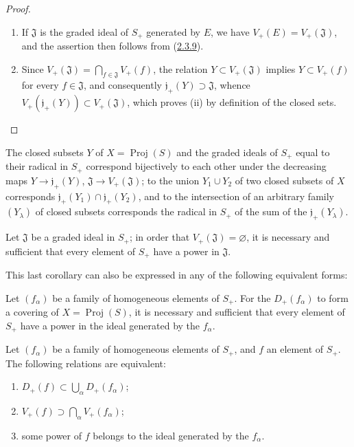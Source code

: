 \begin{proof}
\begin{enumerate}
  \item[\rm(i)] If $\mathfrak{J}$ is the graded ideal of $S_+$ generated
    by $E$, we have $V_+(E)=V_+(\mathfrak{J})$, and the assertion then
    follows from (\hyperref[II.2.3.9]{2.3.9}).
  \item[\rm(ii)] Since
    $V_+(\mathfrak{J})=\bigcap_{f\in\mathfrak{J}}V_+(f)$, the relation
    $Y\subset V_+(\mathfrak{J})$ implies $Y\subset V_+(f)$ for every
    $f\in\mathfrak{J}$, and consequently
    $\mathfrak{j}_+(Y)\supset\mathfrak{J}$, whence
    $V_+(\mathfrak{j}_+(Y))\subset V_+(\mathfrak{J})$, which proves (ii)
    by definition of the closed sets.
\end{enumerate}
\end{proof}

\begin{corollary}[2.3.12]
\label{II.2.3.12}
The closed subsets $Y$ of $X=\operatorname{Proj}(S)$ and the graded ideals
of $S_+$ equal to their radical in $S_+$ correspond bijectively to each
other under the decreasing maps
$Y\to\mathfrak{j}_+(Y)$, $\mathfrak{J}\to
V_+(\mathfrak{J})$; to the union $Y_1\cup Y_2$ of two closed subsets of
$X$ corresponds
$\mathfrak{j}_+(Y_1)\cap\mathfrak{j}_+(Y_2)$, and to the intersection of an
arbitrary family $(Y_\lambda)$ of closed subsets corresponds the radical
in $S_+$ of the sum of the $\mathfrak{j}_+(Y_\lambda)$.
\end{corollary}

\begin{corollary}[2.3.13]
\label{II.2.3.13}
Let $\mathfrak{J}$ be a graded ideal in $S_+$; in order that
$V_+(\mathfrak{J})=\varnothing$, it is necessary and sufficient that every
element of $S_+$ have a power in $\mathfrak{J}$.
\end{corollary}

This last corollary can also be expressed in any of the following
equivalent forms:

\begin{corollary}[2.3.14]
\label{II.2.3.14}
Let $(f_\alpha)$ be a family of homogeneous elements of $S_+$. For the
$D_+(f_\alpha)$ to form a covering of
$X=\operatorname{Proj}(S)$, it is necessary and sufficient that every
element of $S_+$ have a power in the ideal generated by the $f_\alpha$.
\end{corollary}

\begin{corollary}[2.3.15]
\label{II.2.3.15}
Let $(f_\alpha)$ be a family of homogeneous elements of $S_+$, and $f$ an
element of $S_+$. The following relations are equivalent:
\begin{enumerate}
  \item[\textit{a)}] $D_+(f)\subset\bigcup_\alpha D_+(f_\alpha)$;
  \item[\textit{b)}] $V_+(f)\supset\bigcap_\alpha V_+(f_\alpha)$;
  \item[\textit{c)}] some power of $f$ belongs to the ideal generated by the
    $f_\alpha$.
\end{enumerate}
\end{corollary}


